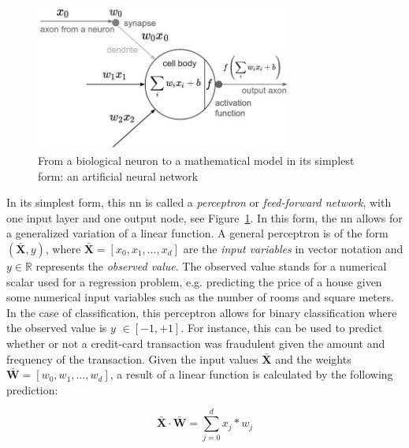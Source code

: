 \documentclass[draft,final]{vutinfth} %
\begin{document}
    \begin{figure}[h]
        \centering
        \includegraphics[width=0.75\textwidth]{figures/neuron_model.png}
        \caption[From a biological neuron to a mathematical model: an artificial neural network in its simplest form]{From a biological neuron to a mathematical model in its simplest form: an artificial neural network\protect\footnotemark}
        \label{fig:neuron_model}
    \end{figure}


    In its simplest form, this \gls{nn} is called a \textit{perceptron} or \textit{feed-forward network}, with one input layer and one output node, see Figure~\ref{fig:neuron_model}.
    In this form, the \gls{nn} allows for a generalized variation of a linear function.
    A general perceptron is of the form $(\bar{\boldsymbol{X}},y)$, where $\bar{\boldsymbol{X}}=[x_0,x_1,\ldots,x_d]$ are the \textit{input variables} in vector notation and $y \in \mathbb{R}$  represents the \textit{observed value}.
    The observed value stands for a numerical scalar used for a regression problem, e.g. predicting the price of a house given some numerical input variables such as the number of rooms and square meters.
    In the case of classification, this perceptron allows for binary classification where the observed value is $y$ $\in [-1,+1]$.
    For instance, this can be used to predict whether or not a credit-card transaction was fraudulent given the amount and frequency of the transaction.
    Given the input values $\bar{\boldsymbol{X}}$ and the weights $\bar{\boldsymbol{W}}=[w_0,w_1,\ldots,w_d]$, a result of a linear function is calculated by the following prediction:

    \begin{equation}
        \bar{\boldsymbol{X}}\cdot\bar{\boldsymbol{W}}=\sum_{j=0}^{d}x_j*w_j\label{eq:feed_forward_equation}
    \end{equation}
\end{document}
